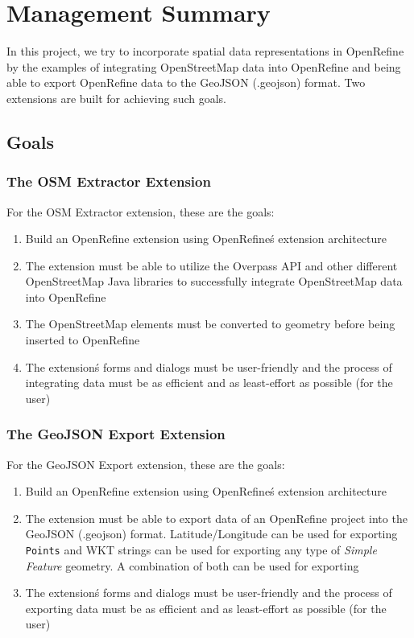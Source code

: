 \chapter*{Management Summary}
In this project, we try to incorporate spatial data representations in OpenRefine by the examples of integrating
OpenStreetMap data into OpenRefine and being able to export OpenRefine data to the GeoJSON (.geojson) format.
Two extensions are built for achieving such goals.
\section*{Goals}
\subsection*{The OSM Extractor Extension}
For the OSM Extractor extension, these are the goals:
\begin{enumerate}
    \item Build an OpenRefine extension using OpenRefine\'s extension architecture
    \item The extension must be able to utilize the Overpass API and other different OpenStreetMap Java libraries to successfully
    integrate OpenStreetMap data into OpenRefine
    \item The OpenStreetMap elements must be converted to  geometry before being inserted to OpenRefine
    \item The extension\'s forms and dialogs must be user-friendly and the process of integrating data must be as efficient
    and as least-effort as possible (for the user)
\end{enumerate}
\subsection*{The GeoJSON Export Extension}
For the GeoJSON Export extension, these are the goals:
\begin{enumerate}
    \item Build an OpenRefine extension using OpenRefine\'s extension architecture
    \item The extension must be able to export data of an OpenRefine project into the GeoJSON (.geojson) format. Latitude/Longitude
    can be used for exporting \texttt{Points} and WKT strings can be used for exporting any type of \textit{Simple Feature} geometry.
    A combination of both can be used for exporting
    \item The extension\'s forms and dialogs must be user-friendly and the process of exporting data must be as efficient
    and as least-effort as possible (for the user)
\end{enumerate}
\pagebreak
